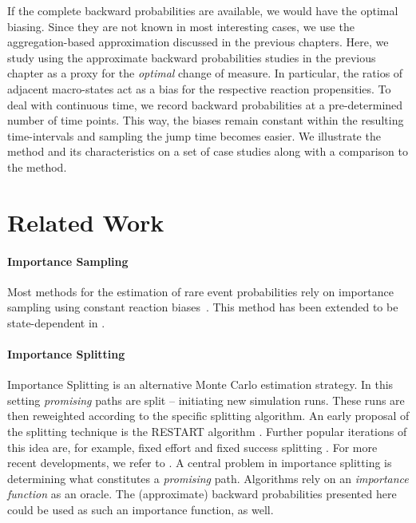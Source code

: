 If the complete backward probabilities are available, we would have the optimal biasing.
Since they are not known in most interesting cases, we use the aggregation-based approximation discussed in the previous chapters.
Here, we study using the approximate backward probabilities studies in the previous chapter as a proxy for the \emph{optimal} change of measure.
In particular, the ratios of adjacent macro-states act as a bias for the respective reaction propensities.
To deal with continuous time, we record backward probabilities at a pre-determined number of time points.
This way, the biases remain constant within the resulting time-intervals and sampling the jump time becomes easier.
We illustrate the method and its characteristics on a set of case studies along with a comparison to the  method.


\section{Related Work}
\paragraph{Importance Sampling}
Most methods for the estimation of rare event probabilities  rely on  importance sampling using constant reaction biases~\parencite{kuwahara2008efficient,daigle2011automated,chong2017path}.
This method has been extended to be state-dependent in \citet{roh2011state}.

\paragraph{Importance Splitting}
Importance Splitting is an alternative Monte Carlo estimation strategy.
In this setting \emph{promising} paths are split -- initiating new simulation runs.
These runs are then reweighted according to the specific splitting algorithm.
An early proposal of the splitting technique is the \ac{RESTART} algorithm \parencite{villen1994restart}.
Further popular iterations of this idea are, for example, fixed effort and fixed success splitting \parencite{garvels1998comparison}.
For more recent developments, we refer to \parencite{budde2017better,jegourel2013importance}.
A central problem in importance splitting is determining what constitutes a \emph{promising} path.
Algorithms rely on an \emph{importance function} as an oracle.
The (approximate) backward probabilities presented here could be used as such an importance function, as well.

